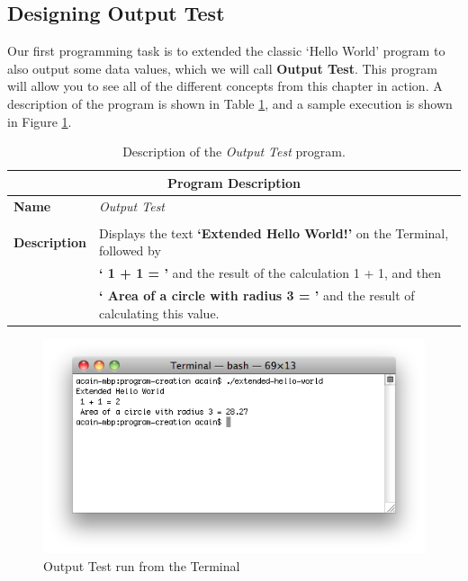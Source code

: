 \subsection{Designing Output Test} %
\label{sub:designing_hello_world}

Our first programming task is to extended the classic `Hello World' program to also output some data values, which we will call \textbf{Output Test}. This program will allow you to see all of the different concepts from this chapter in action. A description of the program is shown in Table \ref{tbl:program-creation-hello world description}, and a sample execution is shown in Figure \ref{fig:program-creation-helloworld2}.

\begin{table}[h]
\centering
\begin{tabular}{l|p{12cm}}
  \hline
  \multicolumn{2}{c}{\textbf{Program Description}} \\
  \hline
  \textbf{Name} & \emph{Output Test} \\
  \\
  \textbf{Description} & Displays the text \textbf{`Extended Hello World!'} on the Terminal, followed by \\
                       & \textbf{` 1 + 1 = '} and the result of the calculation 1 + 1, and then \\
                       & \textbf{` Area of a circle with radius 3 = '} and the result of calculating this value. \\
  \hline
\end{tabular}
\caption[Output Test Description]{Description of the \emph{Output Test} program.}
\label{tbl:program-creation-hello world description}
\end{table}

\begin{figure}[h]
   \centering
   \includegraphics[width=\textwidth]{./topics/program-creation/images/HelloWorld} 
   \caption{Output Test run from the Terminal}
   \label{fig:program-creation-helloworld2}
\end{figure}

